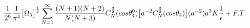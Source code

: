 \begin{equation}
\frac{1}{2^9}\frac{1}{\pi^4}\big{[}\Omega_5\big{]}^{\frac{1}{2}}\sum_{N=1}^{\infty}\frac{(N + 1)(N + 2)}{N(N + 3)}C_N^{\frac{3}{2}}(cos{\theta_4^0})\big{[}a^{-2}C_N^{\frac{3}{2}}(cos{\theta_4})\big{]}
(a^{-2})a^3K \frac{1}{\epsilon} + F. T.
\end{equation}

